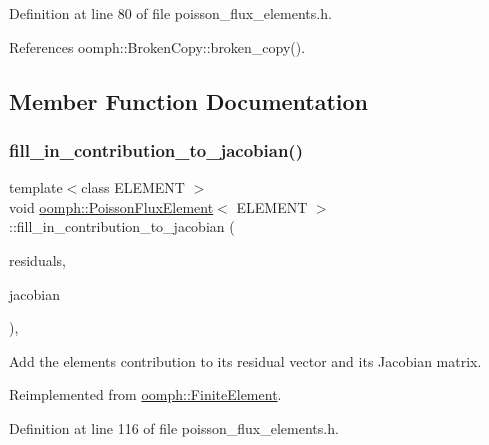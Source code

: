 Definition at line 80 of file poisson\+\_\+flux\+\_\+elements.\+h.



References oomph\+::\+Broken\+Copy\+::broken\+\_\+copy().



\subsection{Member Function Documentation}
\mbox{\label{classoomph_1_1PoissonFluxElement_a7be7daf3b3b3ba50a216d40d1d8016f5}} 
\subsubsection{\texorpdfstring{fill\+\_\+in\+\_\+contribution\+\_\+to\+\_\+jacobian()}{fill\_in\_contribution\_to\_jacobian()}}
{\footnotesize\ttfamily template$<$class E\+L\+E\+M\+E\+NT $>$ \\
void \hyperlink{classoomph_1_1PoissonFluxElement}{oomph\+::\+Poisson\+Flux\+Element}$<$ E\+L\+E\+M\+E\+NT $>$\+::fill\+\_\+in\+\_\+contribution\+\_\+to\+\_\+jacobian (\begin{DoxyParamCaption}\item[{\hyperlink{classoomph_1_1Vector}{Vector}$<$ double $>$ \&}]{residuals,  }\item[{\hyperlink{classoomph_1_1DenseMatrix}{Dense\+Matrix}$<$ double $>$ \&}]{jacobian }\end{DoxyParamCaption})\hspace{0.3cm}{\ttfamily [inline]}, {\ttfamily [virtual]}}



Add the element\textquotesingle{}s contribution to its residual vector and its Jacobian matrix. 



Reimplemented from \hyperlink{classoomph_1_1FiniteElement_a0ae7af222af38a0d53bf283dc85bdfea}{oomph\+::\+Finite\+Element}.



Definition at line 116 of file poisson\+\_\+flux\+\_\+elements.\+h.



